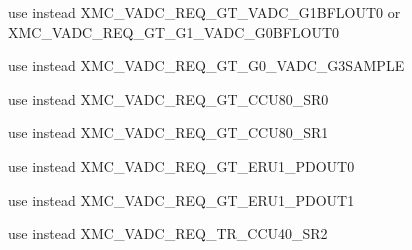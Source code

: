 \begin{DoxyRefList}
%
use instead X\+M\+C\+\_\+\+V\+A\+D\+C\+\_\+\+R\+E\+Q\+\_\+\+G\+T\+\_\+\+V\+A\+D\+C\+\_\+\+G1\+B\+F\+L\+O\+U\+T0 or X\+M\+C\+\_\+\+V\+A\+D\+C\+\_\+\+R\+E\+Q\+\_\+\+G\+T\+\_\+\+G1\+\_\+\+V\+A\+D\+C\+\_\+\+G0\+B\+F\+L\+O\+U\+T0  
\item[Global \mbox{\hyperlink{xmc__vadc__map_8h_a7cfc4587f940709ed6e0e43a18810876}{X\+M\+C\+\_\+\+V\+A\+D\+C\+\_\+\+G0\+\_\+\+S\+A\+M\+P\+LE}} ]\label{deprecated__deprecated000030}%
%
use instead X\+M\+C\+\_\+\+V\+A\+D\+C\+\_\+\+R\+E\+Q\+\_\+\+G\+T\+\_\+\+G0\+\_\+\+V\+A\+D\+C\+\_\+\+G3\+S\+A\+M\+P\+LE  
\item[Global \mbox{\hyperlink{xmc__vadc__map_8h_a5a144bc12507c1137398c6968dafc79d}{X\+M\+C\+\_\+\+C\+C\+U\+\_\+80\+\_\+\+S\+R0}} ]\label{deprecated__deprecated000031}%
%
use instead X\+M\+C\+\_\+\+V\+A\+D\+C\+\_\+\+R\+E\+Q\+\_\+\+G\+T\+\_\+\+C\+C\+U80\+\_\+\+S\+R0  
\item[Global \mbox{\hyperlink{xmc__vadc__map_8h_adf76622e63ffb15567f6f4bc1ba72ce6}{X\+M\+C\+\_\+\+C\+C\+U\+\_\+80\+\_\+\+S\+R1}} ]\label{deprecated__deprecated000032}%
%
use instead X\+M\+C\+\_\+\+V\+A\+D\+C\+\_\+\+R\+E\+Q\+\_\+\+G\+T\+\_\+\+C\+C\+U80\+\_\+\+S\+R1  
\item[Global \mbox{\hyperlink{xmc__vadc__map_8h_aed255bd0af0f25ccd036eb87bedf3b19}{X\+M\+C\+\_\+\+E\+R\+U\+\_\+1\+\_\+\+P\+D\+O\+U\+T0}} ]\label{deprecated__deprecated000033}%
%
use instead X\+M\+C\+\_\+\+V\+A\+D\+C\+\_\+\+R\+E\+Q\+\_\+\+G\+T\+\_\+\+E\+R\+U1\+\_\+\+P\+D\+O\+U\+T0  
\item[Global \mbox{\hyperlink{xmc__vadc__map_8h_a5ce68fbbab56e759f8cc5a9c30b39e07}{X\+M\+C\+\_\+\+E\+R\+U\+\_\+1\+\_\+\+P\+D\+O\+U\+T1}} ]\label{deprecated__deprecated000034}%
%
use instead X\+M\+C\+\_\+\+V\+A\+D\+C\+\_\+\+R\+E\+Q\+\_\+\+G\+T\+\_\+\+E\+R\+U1\+\_\+\+P\+D\+O\+U\+T1  
\item[Global \mbox{\hyperlink{xmc__vadc__map_8h_a84810f4a5759e0110371f4d3bee85b5c}{X\+M\+C\+\_\+\+C\+C\+U\+\_\+40\+\_\+\+S\+R2}} ]\label{deprecated__deprecated000035}%
%
use instead X\+M\+C\+\_\+\+V\+A\+D\+C\+\_\+\+R\+E\+Q\+\_\+\+T\+R\+\_\+\+C\+C\+U40\+\_\+\+S\+R2  
\item[Global \mbox{\hyperlink{xmc__vadc__map_8h_ad0a3e78c9d4db2d24d578774348569a1}{X\+M\+C\+\_\+\+C\+C\+U\+\_\+40\+\_\+\+S\+R3}} ]\label{deprecated__deprecated000036}%

\end{DoxyRefList}
